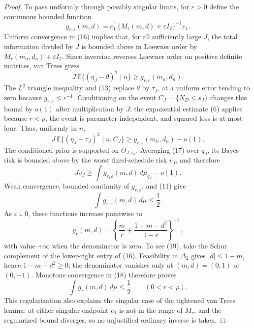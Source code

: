 \documentclass{article}
\begin{document}
\begin{proof}
To pass uniformly through possibly singular limits, for \(\varepsilon>0\) define the continuous bounded function
\[
 g_{r,\varepsilon}(m,d)
 =e_1^{\!\top}\{M_r(m,d)+\varepsilon I_2\}^{-1}e_1.
\]
Uniform convergence in (16) implies that, for all sufficiently large \(J\), the total information divided by \(J\) is bounded above in Loewner order by \(M_r(m_n,d_n)+\varepsilon I_2\).  Since inversion reverses Loewner order on positive definite matrices, van Trees gives
\[
 J\,\mathbb E\{(\eta_J-\theta)^2\mid n\}
 \ge g_{r,\varepsilon}(m_n,d_n).
\]
The \(L^2\) triangle inequality and (13) replace \(\theta\) by \(\tau_J\), at a uniform error tending to zero because \(g_{r,\varepsilon}\le\varepsilon^{-1}\).  Conditioning on the event \(C_J=\{N_D\le s_J\}\) changes this bound by \(o(1)\) after multiplication by \(J\): the exponential estimate (6) applies because \(r<\rho\), the event is parameter-independent, and squared loss is at most four.  Thus, uniformly in \(n\),
\[
 J\,\mathbb E\{(\eta_J-\tau_J)^2\mid n,C_J\}
 \ge g_{r,\varepsilon}(m_n,d_n)-o(1).
 \tag{17}
\]
The conditioned prior is supported on \(\Theta_{J,s_J}\).  Averaging (17) over \(q_J\), its Bayes risk is bounded above by the worst fixed-schedule risk \(v_J\), and therefore
\[
 Jv_J\ge\int g_{r,\varepsilon}(m,d)\,d\mu_{q_J}-o(1).
 \tag{18}
\]
Weak convergence, bounded continuity of \(g_{r,\varepsilon}\), and (11) give
\[
 \int g_{r,\varepsilon}(m,d)\,d\mu\le\frac12.
\]
As \(\varepsilon\downarrow0\), these functions increase pointwise to
\[
 g_r(m,d)=
 \left\{\frac m r+\frac{1-m-d^2}{1-r}\right\}^{-1},
 \tag{19}
\]
with value \(+\infty\) when the denominator is zero.  To see (19), take the Schur complement of the lower-right entry of (16).  Feasibility in \(\Delta_2\) gives \(|d|\le1-m\), hence \(1-m-d^2\ge0\); the denominator vanishes only at \((m,d)=(0,1)\) or \((0,-1)\).  Monotone convergence in (18) therefore proves
\[
 \int g_r(m,d)\,d\mu\le\frac12
 \qquad(0<r<\rho).
 \tag{20}
\]
This regularization also explains the singular case of the tightened van Trees lemma: at either singular endpoint \(e_1\) is not in the range of \(M_r\), and the regularized bound diverges, so no unjustified ordinary inverse is taken.


\end{proof}
\end{document}
